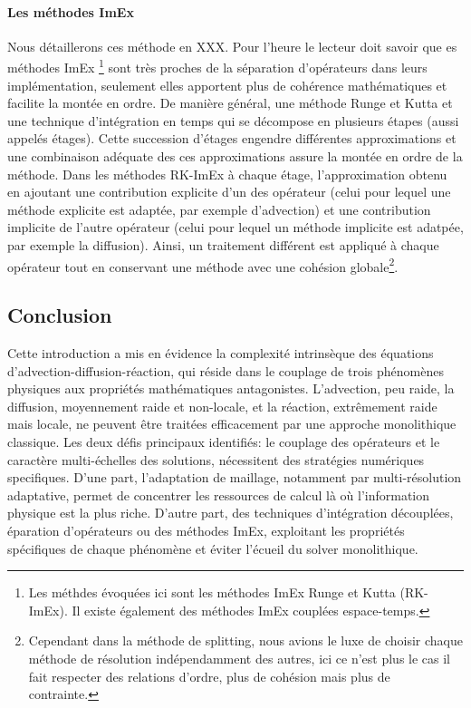         \paragraph{Les méthodes ImEx}
            Nous détaillerons ces méthode en XXX. Pour l'heure le lecteur doit savoir que es méthodes ImEx
            \footnote{Les méthdes évoquées ici sont les méthodes ImEx Runge et Kutta (RK-ImEx). Il existe également des méthodes ImEx couplées espace-temps\cite{rebou2024}.}  \cite{pareschi2010implicitexplicitrungekuttaschemesapplications} \cite{KENNEDY2003139}
            sont très proches de la séparation d'opérateurs dans leurs implémentation, seulement elles apportent plus de cohérence mathématiques
            et facilite la montée en ordre. De manière général, une méthode Runge et Kutta et une technique d'intégration en temps 
            qui se décompose en plusieurs étapes (aussi appelés étages).
            Cette succession d'étages engendre différentes approximations et une combinaison adéquate des ces approximations assure la montée en ordre de la méthode.
            Dans les méthodes RK-ImEx à chaque étage, l'approximation obtenu en ajoutant une contribution explicite d'un des opérateur (celui pour lequel une méthode explicite est adaptée, par exemple d'advection)
            et une contribution implicite de l'autre opérateur (celui pour lequel un méthode implicite est adatpée, par exemple la diffusion).
            Ainsi, un traitement différent est appliqué à chaque opérateur tout en conservant une méthode avec une cohésion globale\footnote{Cependant dans la méthode de splitting,
            nous avions le luxe de choisir chaque méthode de résolution indépendamment des autres, ici ce n'est plus le cas il fait respecter des relations d'ordre,
            plus de cohésion mais plus de contrainte.}.

\subsection{Conclusion}
Cette introduction a mis en évidence la complexité intrinsèque des équations d'advection-diffusion-réaction, 
qui réside dans le couplage de trois phénomènes physiques aux propriétés mathématiques antagonistes. 
L'advection, peu raide, la diffusion, moyennement raide et non-locale, et la réaction, extrêmement raide mais locale, 
ne peuvent être traitées efficacement par une approche monolithique classique.
Les deux défis principaux identifiés: le couplage des opérateurs et le caractère multi-échelles des solutions, 
nécessitent des stratégies numériques specifiques. 
D'une part, l'adaptation de maillage, notamment par multi-résolution adaptative, permet de concentrer les ressources de calcul là où l'information physique est la plus riche. 
D'autre part, des techniques d'intégration découplées, éparation d'opérateurs ou des méthodes ImEx, exploitant les propriétés spécifiques de chaque phénomène et éviter l'écueil du solver monolithique.
